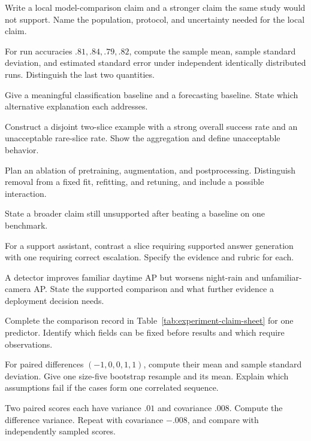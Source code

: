 \begin{exercises}
\item {}Write a local model-comparison claim and a stronger claim the same study would not support. Name the population, protocol, and uncertainty needed for the local claim.
\item {}For run accuracies $.81,.84,.79,.82$, compute the sample mean, sample standard deviation, and estimated standard error under independent identically distributed runs. Distinguish the last two quantities.
\item {}Give a meaningful classification baseline and a forecasting baseline. State which alternative explanation each addresses.
\item {}Construct a disjoint two-slice example with a strong overall success rate and an unacceptable rare-slice rate. Show the aggregation and define unacceptable behavior.
\item {}Plan an ablation of pretraining, augmentation, and postprocessing. Distinguish removal from a fixed fit, refitting, and retuning, and include a possible interaction.
\item {}State a broader claim still unsupported after beating a baseline on one benchmark.
\item {}For a support assistant, contrast a slice requiring supported answer generation with one requiring correct escalation. Specify the evidence and rubric for each.
\item {}A detector improves familiar daytime AP but worsens night-rain and unfamiliar-camera AP. State the supported comparison and what further evidence a deployment decision needs.
\item {}Complete the comparison record in Table~\ref{tab:experiment-claim-sheet} for one predictor. Identify which fields can be fixed before results and which require observations.
\item {}For paired differences $(-1,0,0,1,1)$, compute their mean and sample standard deviation. Give one size-five bootstrap resample and its mean. Explain which assumptions fail if the cases form one correlated sequence.
\item {}Two paired scores each have variance $.01$ and covariance $.008$. Compute the difference variance. Repeat with covariance $-.008$, and compare with independently sampled scores.

\end{exercises}
